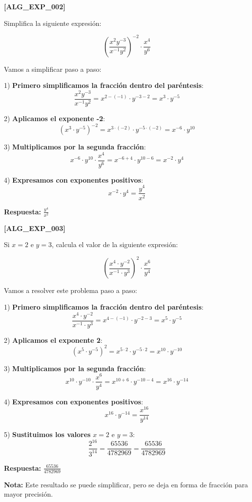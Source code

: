 \documentclass[12pt,a4paper]{book}
\newenvironment{ejercicio}[1][]{%
    \begin{trivlist}\item[\hskip \labelsep {\bfseries Ejercicio.}]
    \if\relax\detokenize{#1}\relax
    \else
        \textbf{[#1]}
    \fi
}{%
    \end{trivlist}
}
\newenvironment{solucion}{%
    \begin{trivlist}\item[\hskip \labelsep {\bfseries Solución.}]
    \color{blue}
}{%
    \color{black}
    \end{trivlist}
}
\begin{document}
\begin{ejercicio}[ALG\_EXP\_002]
Simplifica la siguiente expresión:

$$\left(\frac{x^2 y^{-3}}{x^{-1} y^2}\right)^{-2} \cdot \frac{x^4}{y^6}$$

\begin{solucion}
Vamos a simplificar paso a paso:

1) \textbf{Primero simplificamos la fracción dentro del paréntesis}:
   $$\frac{x^2 y^{-3}}{x^{-1} y^2} = x^{2-(-1)} \cdot y^{-3-2} = x^3 \cdot y^{-5}$$

2) \textbf{Aplicamos el exponente -2}:
   $$\left(x^3 \cdot y^{-5}\right)^{-2} = x^{3 \cdot (-2)} \cdot y^{-5 \cdot (-2)} = x^{-6} \cdot y^{10}$$

3) \textbf{Multiplicamos por la segunda fracción}:
   $$x^{-6} \cdot y^{10} \cdot \frac{x^4}{y^6} = x^{-6+4} \cdot y^{10-6} = x^{-2} \cdot y^4$$

4) \textbf{Expresamos con exponentes positivos}:
   $$x^{-2} \cdot y^4 = \frac{y^4}{x^2}$$

\textbf{Respuesta:} $\frac{y^4}{x^2}$
\end{solucion}
\end{ejercicio}

\begin{ejercicio}[ALG\_EXP\_003]
Si $x = 2$ e $y = 3$, calcula el valor de la siguiente expresión:

$$\left(\frac{x^4 \cdot y^{-2}}{x^{-1} \cdot y^3}\right)^2 \cdot \frac{x^6}{y^4}$$

\begin{solucion}
Vamos a resolver este problema paso a paso:

1) \textbf{Primero simplificamos la fracción dentro del paréntesis}:
   $$\frac{x^4 \cdot y^{-2}}{x^{-1} \cdot y^3} = x^{4-(-1)} \cdot y^{-2-3} = x^5 \cdot y^{-5}$$

2) \textbf{Aplicamos el exponente 2}:
   $$\left(x^5 \cdot y^{-5}\right)^2 = x^{5 \cdot 2} \cdot y^{-5 \cdot 2} = x^{10} \cdot y^{-10}$$

3) \textbf{Multiplicamos por la segunda fracción}:
   $$x^{10} \cdot y^{-10} \cdot \frac{x^6}{y^4} = x^{10+6} \cdot y^{-10-4} = x^{16} \cdot y^{-14}$$

4) \textbf{Expresamos con exponentes positivos}:
   $$x^{16} \cdot y^{-14} = \frac{x^{16}}{y^{14}}$$

5) \textbf{Sustituimos los valores} $x = 2$ e $y = 3$:
   $$\frac{2^{16}}{3^{14}} = \frac{65536}{4782969} = \frac{65536}{4782969}$$

\textbf{Respuesta:} $\frac{65536}{4782969}$

\textbf{Nota:} Este resultado se puede simplificar, pero se deja en forma de fracción para mayor precisión.
\end{solucion}
\end{ejercicio}
\end{document}
